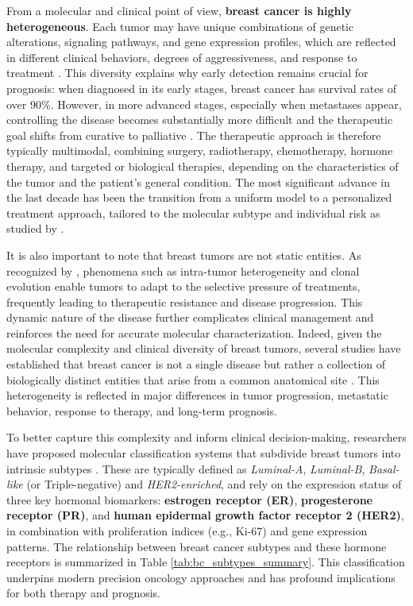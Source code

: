 From a molecular and clinical point of view, \textbf{breast cancer is highly
  heterogeneous}. Each tumor may have unique combinations of genetic alterations,
signaling pathways, and gene expression profiles, which are reflected in
different clinical behaviors, degrees of aggressiveness, and response to
treatment
\cite{origins_and_evolution_bca_Polyak2007,diff_bca_usa_Howlader2018}. This
diversity explains why early detection remains crucial for prognosis: when
diagnosed in its early stages, breast cancer has survival rates of over $90\%$.
However, in more advanced stages, especially when metastases appear,
controlling the disease becomes substantially more difficult and the
therapeutic goal shifts from curative to palliative
\cite{updatedbca_Hong2022Breast,clinical_implication_bca_Adamo2015}. The
therapeutic approach is therefore typically multimodal, combining surgery,
radiotherapy, chemotherapy, hormone therapy, and targeted or biological
therapies, depending on the characteristics of the tumor and the patient’s
general condition. The most significant advance in the last decade has been the
transition from a uniform model to a personalized treatment approach, tailored
to the molecular subtype and individual risk as studied by
\textcite{_Mendes2022Nanodelivery}.

It is also important to note that breast tumors are not static entities. As
recognized by \textcite{origins_and_evolution_bca_Polyak2007}, phenomena such
as intra-tumor heterogeneity and clonal evolution enable tumors to adapt to the
selective pressure of treatments, frequently leading to therapeutic resistance
and disease progression. This dynamic nature of the disease further complicates
clinical management and reinforces the need for accurate molecular
characterization. Indeed, given the molecular complexity and clinical diversity
of breast tumors, several studies have established that breast cancer is not a
single disease but rather a collection of biologically distinct entities that
arise from a common anatomical site
\cite{clinical_implication_bca_Adamo2015,clinical_implication_bca_Adamo2015}. This
heterogeneity is reflected in major differences in tumor progression,
metastatic behavior, response to therapy, and long-term prognosis.

To better capture this complexity and inform clinical decision-making,
researchers have proposed molecular classification systems that subdivide
breast tumors into intrinsic subtypes
\cite{bc_molecular_Perou2000,clinical_implication_bca_Adamo2015}. These are typically
defined as \textit{Luminal-A}, \textit{Luminal-B}, \textit{Basal-like} (or
Triple-negative) and \textit{HER2-enriched}, and rely on the expression status
of three key hormonal biomarkers: \textbf{estrogen receptor (ER)},
\textbf{progesterone receptor (PR)}, and \textbf{human epidermal growth factor
  receptor 2 (HER2)}, in combination with proliferation indices (e.g., Ki-67) and
gene expression patterns. The relationship between breast cancer subtypes and these
hormone receptors is summarized in Table \ref{tab:bc_subtypes_summary}. This
classification underpins modern precision oncology approaches and has profound
implications for both therapy and prognosis.

